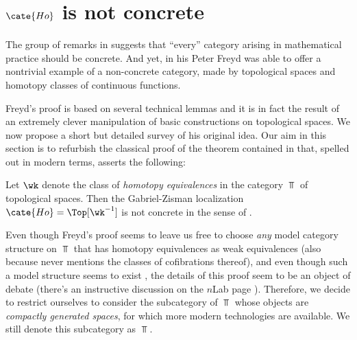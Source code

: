 \section{$\cate{Ho}$ is not concrete}
The group of remarks in  suggests that ``every'' category arising in mathematical practice should be concrete. And yet, in his \cite{fconc} Peter Freyd was able to offer a nontrivial example of a non-concrete category, made by topological spaces and homotopy classes of continuous functions.

Freyd's proof is based on several technical lemmas and it is in fact the result of an extremely clever manipulation of basic constructions on topological spaces. We now propose a short but detailed survey of his original idea.
Our aim in this section is to refurbish the classical proof of the theorem contained in \cite{fconc} that, spelled out in modern terms, asserts the following:
\begin{theorem}\label{honoconc}
Let $\wk$ denote the class of \emph{homotopy equivalences} in the category $\Top$ of topological spaces. Then the Gabriel-Zisman localization \cite{GZ} $\cate{Ho}=\Top[\wk^{-1}]$ is not concrete in the sense of \adef{}.
\end{theorem}
\begin{remark}
Even though Freyd's proof seems to leave us free to choose \emph{any} model category structure on $\Top$ that has homotopy equivalences as weak equivalences (also because \cite{fconc} never mentions the classes of cofibrations thereof), and even though such a model structure seems to exist \cite{strom1972homotopy}, the details of this proof seem to be an object of debate (there's an instructive discussion on the $n$Lab page \cite{nlabstrommodel}). Therefore, we decide to restrict ourselves to consider the subcategory of $\Top$ whose objects are \emph{compactly generated spaces}, for which more modern technologies are available. We still denote this subcategory as $\Top$.
\end{remark}
